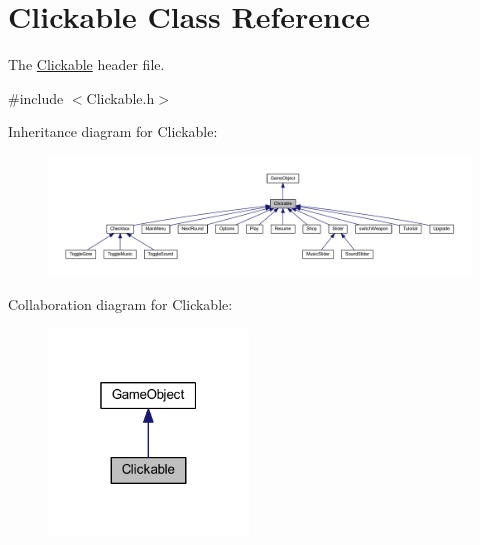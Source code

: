 \hypertarget{class_clickable}{\section{Clickable Class Reference}
\label{class_clickable}
}


The \hyperlink{class_clickable}{Clickable} header file.  




{\ttfamily \#include $<$Clickable.\+h$>$}



Inheritance diagram for Clickable\+:
\nopagebreak
\begin{figure}[H]
\begin{center}
\leavevmode
\includegraphics[width=350pt]{class_clickable__inherit__graph}
\end{center}
\end{figure}


Collaboration diagram for Clickable\+:\nopagebreak
\begin{figure}[H]
\begin{center}
\leavevmode
\includegraphics[width=151pt]{class_clickable__coll__graph}
\end{center}
\end{figure}
